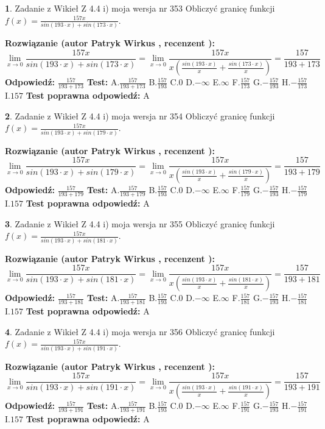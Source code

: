 \documentclass[12pt, a4paper]{article}
\theoremstyle{definition} %
\newtheorem{zad}{}
\newcommand{\zadStart}[1]{\begin{zad}#1\newline}
\newcommand{\zadStop}{\end{zad}}
\newcommand{\rozwStart}[2]{\noindent \textbf{Rozwiązanie (autor #1 , recenzent #2): }\newline}
\newcommand{\rozwStop}{\newline}
\newcommand{\odpStart}{\noindent \textbf{Odpowiedź:}\newline}
\newcommand{\odpStop}{\newline}
\newcommand{\testStart}{\noindent \textbf{Test:}\newline}
\newcommand{\testStop}{\newline}
\newcommand{\kluczStart}{\noindent \textbf{Test poprawna odpowiedź:}\newline}
\newcommand{\kluczStop}{\newline}
\begin{document}
\zadStart{Zadanie z Wikieł Z 4.4 i) moja wersja nr 353}
Obliczyć granicę funkcji $f(x)=\frac{157x}{sin(193\cdot x) +sin(173\cdot x)}$.
\zadStop
\rozwStart{Patryk Wirkus}{}
$$\lim\limits_{x\to 0}\frac{157x}{sin(193\cdot x) +sin(173\cdot x)}=\lim\limits_{x\to 0}\frac{157x}{x(\frac{sin(193\cdot x)}{x}+\frac{sin(173\cdot x)}{x})}=\frac{157}{193+173}$$
\rozwStop
\odpStart
$\frac{157}{193+173}$
\odpStop
\testStart
A.$\frac{157}{193+173}$
B.$\frac{157}{193}$
C.$0$
D.$-\infty$
E.$\infty$
F.$\frac{157}{173}$
G.$-\frac{157}{193}$
H.$-\frac{157}{173}$
I.$157$
\testStop
\kluczStart
A
\kluczStop



\zadStart{Zadanie z Wikieł Z 4.4 i) moja wersja nr 354}
Obliczyć granicę funkcji $f(x)=\frac{157x}{sin(193\cdot x) +sin(179\cdot x)}$.
\zadStop
\rozwStart{Patryk Wirkus}{}
$$\lim\limits_{x\to 0}\frac{157x}{sin(193\cdot x) +sin(179\cdot x)}=\lim\limits_{x\to 0}\frac{157x}{x(\frac{sin(193\cdot x)}{x}+\frac{sin(179\cdot x)}{x})}=\frac{157}{193+179}$$
\rozwStop
\odpStart
$\frac{157}{193+179}$
\odpStop
\testStart
A.$\frac{157}{193+179}$
B.$\frac{157}{193}$
C.$0$
D.$-\infty$
E.$\infty$
F.$\frac{157}{179}$
G.$-\frac{157}{193}$
H.$-\frac{157}{179}$
I.$157$
\testStop
\kluczStart
A
\kluczStop



\zadStart{Zadanie z Wikieł Z 4.4 i) moja wersja nr 355}
Obliczyć granicę funkcji $f(x)=\frac{157x}{sin(193\cdot x) +sin(181\cdot x)}$.
\zadStop
\rozwStart{Patryk Wirkus}{}
$$\lim\limits_{x\to 0}\frac{157x}{sin(193\cdot x) +sin(181\cdot x)}=\lim\limits_{x\to 0}\frac{157x}{x(\frac{sin(193\cdot x)}{x}+\frac{sin(181\cdot x)}{x})}=\frac{157}{193+181}$$
\rozwStop
\odpStart
$\frac{157}{193+181}$
\odpStop
\testStart
A.$\frac{157}{193+181}$
B.$\frac{157}{193}$
C.$0$
D.$-\infty$
E.$\infty$
F.$\frac{157}{181}$
G.$-\frac{157}{193}$
H.$-\frac{157}{181}$
I.$157$
\testStop
\kluczStart
A
\kluczStop



\zadStart{Zadanie z Wikieł Z 4.4 i) moja wersja nr 356}
Obliczyć granicę funkcji $f(x)=\frac{157x}{sin(193\cdot x) +sin(191\cdot x)}$.
\zadStop
\rozwStart{Patryk Wirkus}{}
$$\lim\limits_{x\to 0}\frac{157x}{sin(193\cdot x) +sin(191\cdot x)}=\lim\limits_{x\to 0}\frac{157x}{x(\frac{sin(193\cdot x)}{x}+\frac{sin(191\cdot x)}{x})}=\frac{157}{193+191}$$
\rozwStop
\odpStart
$\frac{157}{193+191}$
\odpStop
\testStart
A.$\frac{157}{193+191}$
B.$\frac{157}{193}$
C.$0$
D.$-\infty$
E.$\infty$
F.$\frac{157}{191}$
G.$-\frac{157}{193}$
H.$-\frac{157}{191}$
I.$157$
\testStop
\kluczStart
A
\kluczStop
\end{document}
